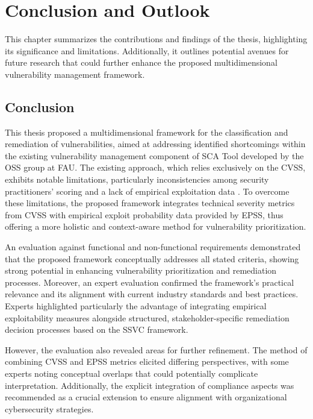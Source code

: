 \chapter{Conclusion and Outlook}
\label{chapter:conclusion-outlook}

This chapter summarizes the contributions and findings of the thesis, highlighting its significance and limitations. Additionally, it outlines potential avenues for future research that could further enhance the proposed multidimensional vulnerability management framework.

\section{Conclusion}
This thesis proposed a multidimensional framework for the classification and remediation of vulnerabilities, aimed at addressing identified shortcomings within the existing vulnerability management component of \ac{SCA} Tool developed by the \ac{OSS} group at \ac{FAU}. The existing approach, which relies exclusively on the \ac{CVSS}, exhibits notable limitations, particularly inconsistencies among security practitioners' scoring and a lack of empirical exploitation data \autocite{spring_time_2021}. To overcome these limitations, the proposed framework integrates technical severity metrics from \ac{CVSS} with empirical exploit probability data provided by \ac{EPSS}, thus offering a more holistic and context-aware method for vulnerability prioritization.

An evaluation against functional and non-functional requirements demonstrated that the proposed framework conceptually addresses all stated criteria, showing strong potential in enhancing vulnerability prioritization and remediation processes. Moreover, an expert evaluation confirmed the framework's practical relevance and its alignment with current industry standards and best practices. Experts highlighted particularly the advantage of integrating empirical exploitability measures alongside structured, stakeholder-specific remediation decision processes based on the \ac{SSVC} framework.

However, the evaluation also revealed areas for further refinement. The method of combining \ac{CVSS} and \ac{EPSS} metrics elicited differing perspectives, with some experts noting conceptual overlaps that could potentially complicate interpretation. Additionally, the explicit integration of compliance aspects was recommended as a crucial extension to ensure alignment with organizational cybersecurity strategies.

